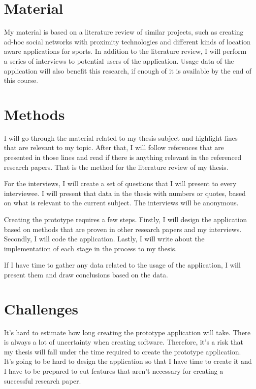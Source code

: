 \documentclass[12pt,a4paper,finnish,oneside]{article}
\begin{document}
\section{Material}

My material is based on a literature review of similar projects, such as creating
ad-hoc social networks with proximity technologies and different kinds of
location aware applications for sports. In addition to the literature review,
I will perform a series of interviews to potential users of the application.
Usage data of the application will also benefit this research, if enough of it
is available by the end of this course.

\section{Methods}

I will go through the material related to my thesis subject and highlight
lines that are relevant to my topic. After that, I will follow references
that are presented in those lines and read if there is anything relevant
in the referenced research papers. That is the method for the literature
review of my thesis.

For the interviews, I will create a set of questions that I will present to
every interviewee. I will present that data in the thesis with numbers or
quotes, based on what is relevant to the current subject. The interviews
will be anonymous.

Creating the prototype requires a few steps. Firstly,
I will design the application based on methods that are proven in other research
papers and my interviews. Secondly, I will code the application. Lastly, I will
write about the implementation of each stage in the process to my thesis.

If I have time to gather any data related to the usage of the application,
I will present them and draw conclusions based on the data.


\section{Challenges}

It's hard to estimate how long creating the prototype application will take.
There is always a lot of uncertainty when creating software. Therefore, it's
a risk that my thesis will fall under the time required to create the prototype
application. It's going to be hard to design the application so that I have
time to create it and I have to be prepared to cut features that aren't
necessary for creating a successful research paper.
\end{document}
